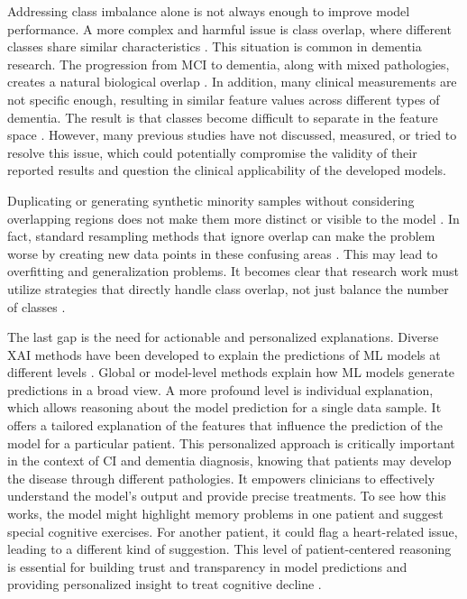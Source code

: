 Addressing class imbalance alone is not always enough to improve model performance. A more complex and harmful issue is class overlap, where different classes share similar characteristics \cite{Santos2022Joint}. This situation is common in dementia research. The progression from MCI to dementia, along with mixed pathologies, creates a natural biological overlap \cite{Alzheimer2025}. In addition, many clinical measurements are not specific enough, resulting in similar feature values across different types of dementia. The result is that classes become difficult to separate in the feature space \cite{Salmi2024Handling}. However, many previous studies have not discussed, measured, or tried to resolve this issue, which could potentially compromise the validity of their reported results and question the clinical applicability of the developed models.

Duplicating or generating synthetic minority samples without considering overlapping regions does not make them more distinct or visible to the model \cite{Santos2022Joint}. In fact, standard resampling methods that ignore overlap can make the problem worse by creating new data points in these confusing areas \cite{Salmi2024Handling}. This may lead to overfitting and generalization problems. It becomes clear that research work must utilize strategies that directly handle class overlap, not just balance the number of classes \cite{Santos2022Joint}.

The last gap is the need for actionable and personalized explanations. Diverse XAI methods have been developed to explain the predictions of ML models at different levels \cite{Viswan2024Explainable}. Global or model-level methods explain how ML models generate predictions in a broad view. A more profound level is individual explanation, which allows reasoning about the model prediction for a single data sample. It offers a tailored explanation of the features that influence the prediction of the model for a particular patient. This personalized approach is critically important in the context of CI and dementia diagnosis, knowing that patients may develop the disease through different pathologies. It empowers clinicians to effectively understand the model's output and provide precise treatments. To see how this works, the model might highlight memory problems in one patient and suggest special cognitive exercises. For another patient, it could flag a heart-related issue, leading to a different kind of suggestion. This level of patient-centered reasoning is essential for building trust and transparency in model predictions and providing personalized insight to treat cognitive decline \cite{Martin2023Interpretable}. 

